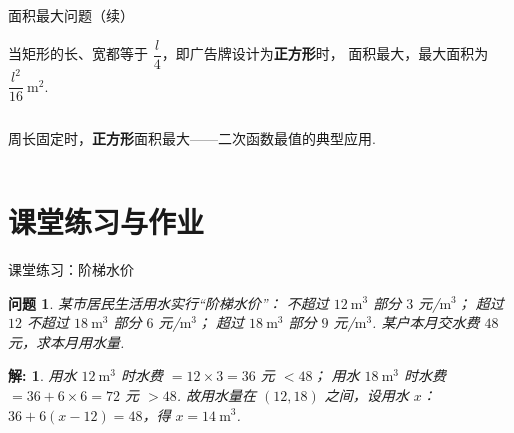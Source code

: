 \documentclass[aspectratio=169,13pt,t] {beamer}
\newtheorem{question}{问题}
\newtheorem*{solve}{解:}
\theoremstyle{definition}
\begin{document}
\begin{frame}{面积最大问题（续）}
	\vspace{-2em}
	\begin{summarybox}[结论]
		当矩形的长、宽都等于 $\dfrac{l}{4}$，即广告牌设计为\textbf{正方形}时，
		面积最大，最大面积为 $\dfrac{l^{2}}{16}\ \mathrm{m^{2}}$.
	\end{summarybox}
	\vspace{1em}
	\begin{columns}
		\begin{summarybox-answer}
			周长固定时，\textbf{正方形}面积最大——二次函数最值的典型应用.
		\end{summarybox-answer}
	\end{columns}
\end{frame}

\section{课堂练习与作业}

\begin{frame}{课堂练习：阶梯水价}
	\begin{question}
		某市居民生活用水实行“阶梯水价”：
		不超过 $12\ \mathrm{m^{3}}$ 部分 $3$ 元/$\mathrm{m^{3}}$；
		超过 $12$ 不超过 $18\ \mathrm{m^{3}}$ 部分 $6$ 元/$\mathrm{m^{3}}$；
		超过 $18\ \mathrm{m^{3}}$ 部分 $9$ 元/$\mathrm{m^{3}}$.
		某户本月交水费 $48$ 元，求本月用水量.
	\end{question}
	\pause
	\begin{solve}
		用水 $12\ \mathrm{m^{3}}$ 时水费 $=12\times3=36$ 元 $<48$；
		用水 $18\ \mathrm{m^{3}}$ 时水费 $=36+6\times6=72$ 元 $>48$.
		故用水量在 $(12,18)$ 之间，设用水 $x$：$36+6(x-12)=48$，得 $x=14\ \mathrm{m^{3}}$.
	\end{solve}
\end{frame}
\end{document}
